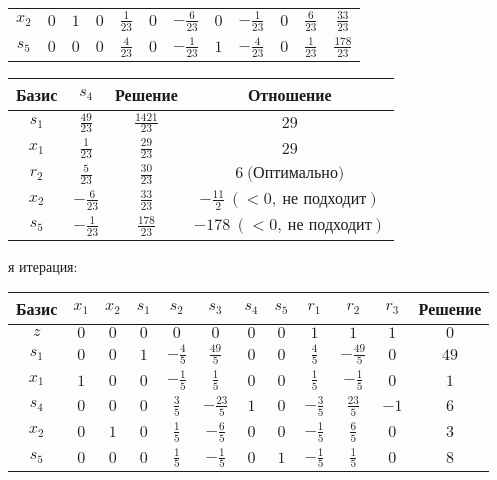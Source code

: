 \documentclass{article}%
\begin{document}
\begin{flushleft}
\begin{tabular}{|c|cccccccccc|c|}
$x_{2}$&$0$&$1$&$0$&$\frac{1}{23}$&$0$&$-\frac{6}{23}$&$0$&$-\frac{1}{23}$&$0$&$\frac{6}{23}$&$\frac{33}{23}$\\%
$s_{5}$&$0$&$0$&$0$&$\frac{4}{23}$&$0$&$-\frac{1}{23}$&$1$&$-\frac{4}{23}$&$0$&$\frac{1}{23}$&$\frac{178}{23}$\\%
\hline%
\end{tabular}%
\newline%
\newline%
\newline%
\begin{tabular}{|cccc|}%
\hline%
Базис&$s_{4}$&Решение&Отношение\\%
\hline%
$s_{1}$&$\frac{49}{23}$&$\frac{1421}{23}$&$29$\\%
$x_{1}$&$\frac{1}{23}$&$\frac{29}{23}$&$29$\\%
$r_{2}$&$\frac{5}{23}$&$\frac{30}{23}$&$6\: \text{(Оптимально)}$\\%
$x_{2}$&$-\frac{6}{23}$&$\frac{33}{23}$&$-\frac{11}{2}\: (< 0, \: \text{не подходит})$\\%
$s_{5}$&$-\frac{1}{23}$&$\frac{178}{23}$&$-178\: (< 0, \: \text{не подходит})$\\%
\hline%
\end{tabular}%
\newline%
\newline%
я итерация: %
\newline%
\newline%
\renewcommand{\arraystretch}{1.3}%
\begin{tabular}{|c|cccccccccc|c|}%
\hline%
Базис&$x_{1}$&$x_{2}$&$s_{1}$&$s_{2}$&$s_{3}$&$s_{4}$&$s_{5}$&$r_{1}$&$r_{2}$&$r_{3}$&Решение\\%
\hline%
$z$&$0$&$0$&$0$&$0$&$0$&$0$&$0$&$1$&$1$&$1$&$0$\\%
\hline%
$s_{1}$&$0$&$0$&$1$&$-\frac{4}{5}$&$\frac{49}{5}$&$0$&$0$&$\frac{4}{5}$&$-\frac{49}{5}$&$0$&$49$\\%
$x_{1}$&$1$&$0$&$0$&$-\frac{1}{5}$&$\frac{1}{5}$&$0$&$0$&$\frac{1}{5}$&$-\frac{1}{5}$&$0$&$1$\\%
$s_{4}$&$0$&$0$&$0$&$\frac{3}{5}$&$-\frac{23}{5}$&$1$&$0$&$-\frac{3}{5}$&$\frac{23}{5}$&$-1$&$6$\\%
$x_{2}$&$0$&$1$&$0$&$\frac{1}{5}$&$-\frac{6}{5}$&$0$&$0$&$-\frac{1}{5}$&$\frac{6}{5}$&$0$&$3$\\%
$s_{5}$&$0$&$0$&$0$&$\frac{1}{5}$&$-\frac{1}{5}$&$0$&$1$&$-\frac{1}{5}$&$\frac{1}{5}$&$0$&$8$\\%
\hline%

\end{tabular}
\end{flushleft}
\end{document}
